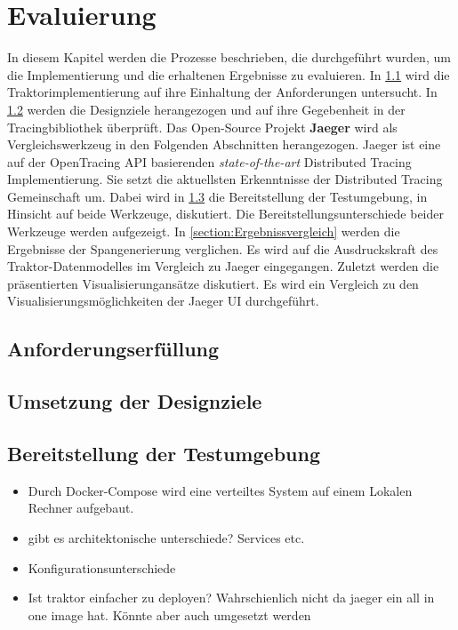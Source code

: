 %

\chapter{Evaluierung}
\label{chapter:Evaluierung}
In diesem Kapitel werden die Prozesse beschrieben, die durchgeführt wurden, um die Implementierung und die erhaltenen Ergebnisse zu evaluieren. In \cref{section:Anforderungserfüllung} wird die Traktorimplementierung auf ihre Einhaltung der Anforderungen  untersucht. In \cref{section:Umsetzung der Designziele} werden die Designziele herangezogen und auf ihre Gegebenheit in der Tracingbibliothek überprüft. Das Open-Source Projekt \textbf{Jaeger} wird als Vergleichswerkzeug in den Folgenden Abschnitten herangezogen. Jaeger ist eine auf der OpenTracing API basierenden \emph{state-of-the-art} Distributed Tracing Implementierung. Sie setzt die aktuellsten Erkenntnisse der Distributed Tracing Gemeinschaft um. Dabei wird in \cref{section:Bereitstellung der Testumgebung} die Bereitstellung der Testumgebung, in Hinsicht auf beide Werkzeuge, diskutiert. Die Bereitstellungsunterschiede beider Werkzeuge werden aufgezeigt. In \cref{section:Ergebnissvergleich} werden die Ergebnisse der Spangenerierung verglichen. Es wird auf die Ausdruckskraft des Traktor-Datenmodelles im Vergleich zu Jaeger eingegangen. Zuletzt werden die präsentierten Visualisierungansätze diskutiert. Es wird ein Vergleich zu den Visualisierungsmöglichkeiten der Jaeger UI durchgeführt.

\section{Anforderungserfüllung}
\label{section:Anforderungserfüllung}
\section{Umsetzung der Designziele}
\label{section:Umsetzung der Designziele}
\section{Bereitstellung der Testumgebung}
\label{section:Bereitstellung der Testumgebung}
\begin{itemize}
	\item Durch Docker-Compose wird eine verteiltes System auf einem Lokalen Rechner aufgebaut.
	\item gibt es architektonische unterschiede? Services etc. 
	\item Konfigurationsunterschiede
	\item Ist traktor einfacher zu deployen? Wahrschienlich nicht da jaeger ein all in one image hat. Könnte aber auch umgesetzt werden
\end{itemize}
